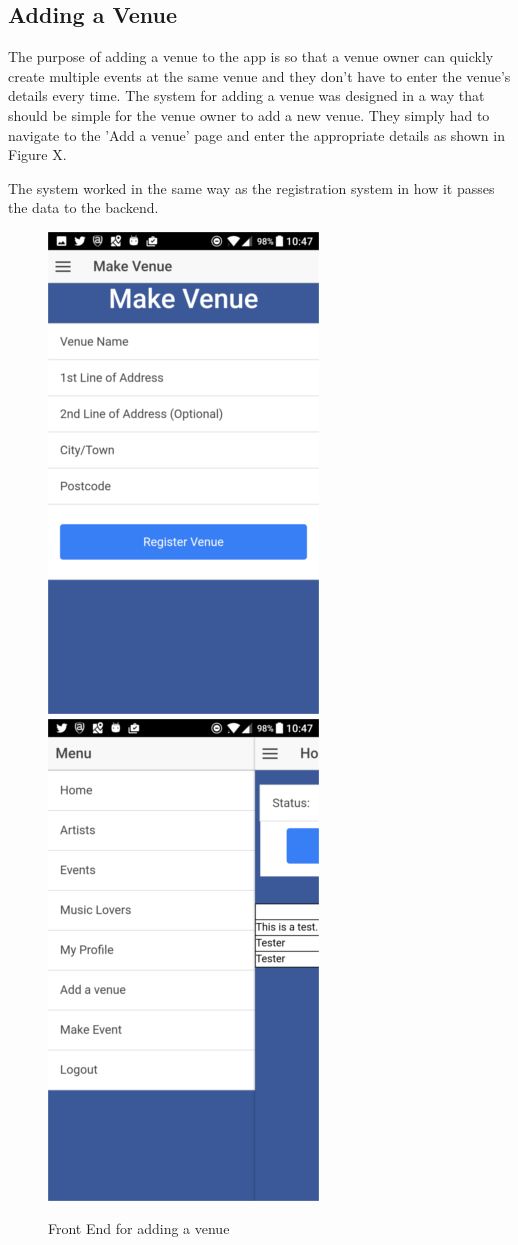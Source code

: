\subsection{Adding a Venue}
The purpose of adding a venue to the app is so that a venue owner can quickly create multiple events at the same venue and they don't have to enter the venue's details every time. The system for adding a venue was designed in a way that should be simple for the venue owner to add a new venue. They simply had to navigate to the 'Add a venue' page and enter the appropriate details as shown in Figure X. 

The system worked in the same way as the registration system in how it passes the data to the backend.

\begin{figure}[H]
\includegraphics[scale=0.5]{images/sc12}
\includegraphics[scale=0.5]{images/sc13}
\caption{Front End for adding a venue}
\end{figure}

